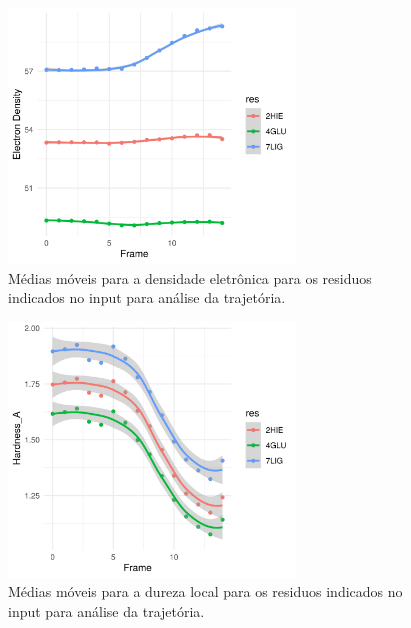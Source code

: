 \documentclass[a4paper,11pt]{refart}
\begin{document}
\hspace*{-\leftmarginwidth}
\begin{minipage}{\fullwidth}
	\begin{figure}[H]
		\begin{center}
			\includegraphics[width=3in]{images/tut6_img14}
			\caption{Médias móveis para a densidade eletrônica para os residuos indicados no input para análise da trajetória.}
			\label{fig_tut6_13}
		\end{center}
	\end{figure}
\end{minipage}

\hspace*{-\leftmarginwidth}
\begin{minipage}{\fullwidth}
	\begin{figure}[H]
		\begin{center}
			\includegraphics[width=3in]{images/tut6_img15}
			\caption{Médias móveis para a dureza local para os residuos indicados no input para análise da trajetória.}
			\label{fig_tut6_14}
		\end{center}
	\end{figure}
\end{minipage}
\end{document}
